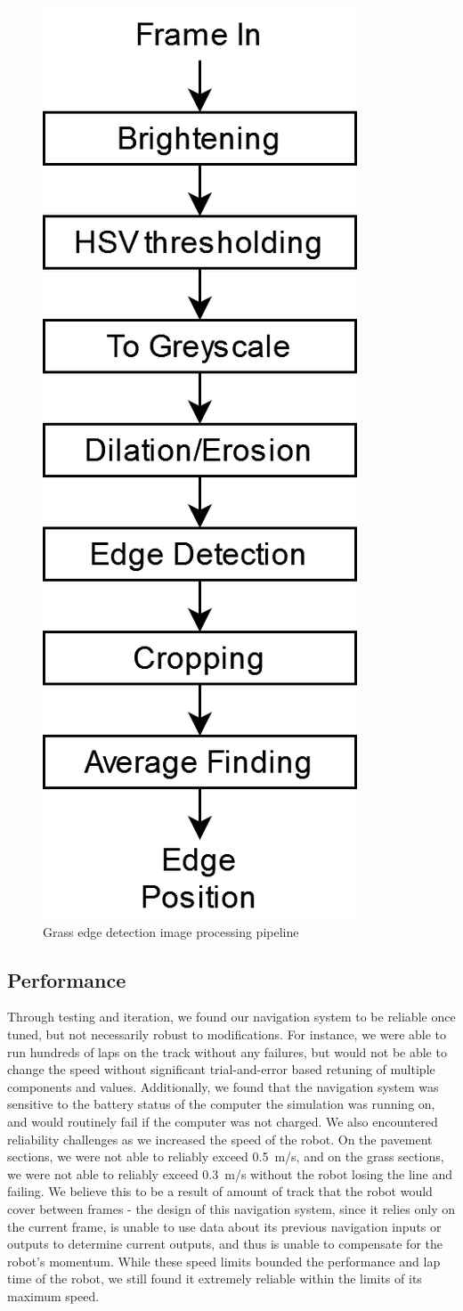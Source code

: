 \documentclass[titlepage, twocolumn]{article}
\begin{document}
            \begin{figure}
                \begin{center}
                    \includegraphics[width=0.3\linewidth]{grasspipeline.png}
                \end{center}
                \caption{Grass edge detection image processing pipeline}
                \label{fig:grasspipeline}
            \end{figure}

    \subsection{Performance}
        Through testing and iteration, we found our navigation system to be reliable once tuned, but not necessarily robust to modifications. For instance, we were able to run hundreds of laps on the track without any failures, but would not be able to change the speed without significant trial-and-error based retuning of multiple components and values. Additionally, we found that the navigation system was sensitive to the battery status of the computer the simulation was running on, and would routinely fail if the computer was not charged. We also encountered reliability challenges as we increased the speed of the robot. On the pavement sections, we were not able to reliably exceed 0.5~m/s, and on the grass sections, we were not able to reliably exceed 0.3~m/s without the robot losing the line and failing. We believe this to be a result of amount of track that the robot would cover between frames - the design of this navigation system, since it relies only on the current frame, is unable to use data about its previous navigation inputs or outputs to determine current outputs, and thus is unable to compensate for the robot's momentum. While these speed limits bounded the performance and lap time of the robot, we still found it extremely reliable within the limits of its maximum speed.
    
\end{document}
